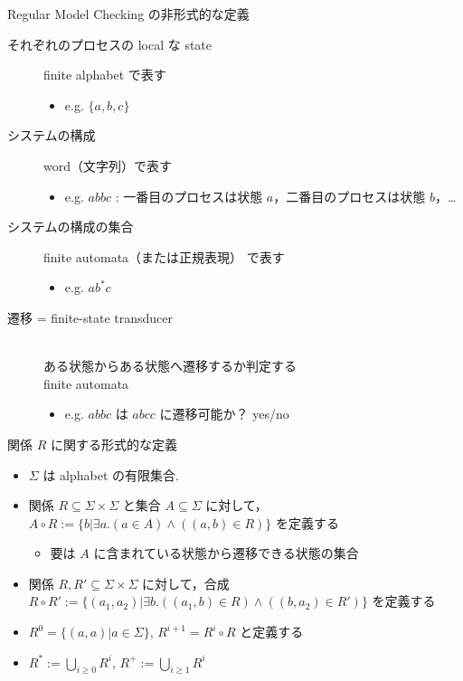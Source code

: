 \documentclass[presentation, xetex]{beamer}
\begin{document}
\begin{frame}[label={sec:org9bb2889}]{Regular Model Checking の非形式的な定義}
\begin{description}
\item[{それぞれのプロセスの local な state}] finite alphabet で表す
\begin{itemize}
\item e.g. \(\{a, b, c\}\)
\end{itemize}
\item[{システムの構成}] word（文字列）で表す
\begin{itemize}
\item e.g. \(abbc\) : 一番目のプロセスは状態 \(a\)，二番目のプロセスは状態 \(b\)，\ldots{}
\end{itemize}
\item[{システムの構成の集合}] finite automata（または正規表現） で表す
\begin{itemize}
\item e.g. \(ab^*c\)
\end{itemize}
\item[{遷移 = \alert{\alert{finite-state transducer}}}] \mbox{}\\
ある状態からある状態へ遷移するか判定する\\
finite automata
\begin{itemize}
\item e.g. \(abbc\) は \(abcc\) に遷移可能か？ \thusmark yes/no
\end{itemize}
\end{description}
\end{frame}


\begin{frame}[label={sec:org4e6893d}]{関係 \(R\) に関する形式的な定義}
\begin{itemize}
\item \(\Sigma\) は \alert{\alert{alphabet}} の有限集合.
\item 関係 \(R \subseteq \Sigma \times \Sigma\) と集合 \(A \subseteq \Sigma\) に対して，\\
\(A \circ R := \{b | \exists a. (a \in A) \land ((a, b) \in R)\}\) を定義する
\begin{itemize}
\item 要は \(A\) に含まれている状態から遷移できる状態の集合
\end{itemize}
\item 関係 \(R, R' \subseteq \Sigma \times \Sigma\) に対して，合成
\(R \circ R' := \{(a_1, a_2) | \exists b. ((a_1, b) \in R) \land ((b, a_2) \in R')\}\)
を定義する
\item \(R^0 = \{(a, a) | a \in \Sigma\}\), \(R^{i + 1} = R^i \circ R\) と定義する
\item \(R^* := \bigcup_{i \geq 0} R^i\), \(R^+ := \bigcup_{i \geq 1} R^i\)
\end{itemize}
\end{frame}
\end{document}

